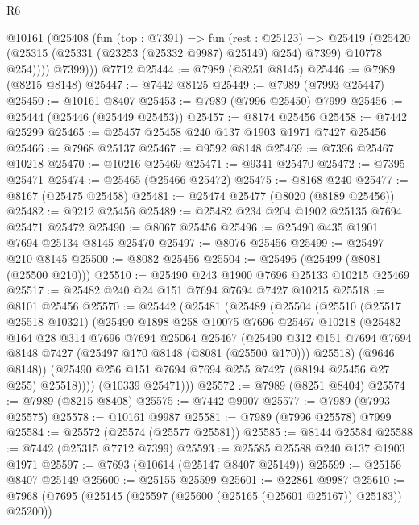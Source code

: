 \begin{lexlean}{R6}
\begin{coremodule}
        @10161
          (@25408
            (fun (top : @7391) =>
            fun (rest : @25123) =>
            @25419
              (@25420 (@25315 (@25331 (@23253 (@25332 @9987) @25149) @254) @7399) @10778 @254))))
          @7399)))
    @7712
@25444 := @7989 (@8251 @8145)
@25446 := @7989 (@8215 @8148)
@25447 := @7442 @8125
@25449 := @7989 (@7993 @25447)
@25450 := @10161 @8407
@25453 := @7989 (@7996 @25450) @7999
@25456 := @25444 (@25446 (@25449 @25453))
@25457 := @8174 @25456
@25458 := @7442 @25299
@25465 := @25457 @25458 @240 @137 @1903 @1971 @7427 @25456
@25466 := @7968 @25137
@25467 := @9592 @8148
@25469 := @7396 @25467 @10218
@25470 := @10216 @25469
@25471 := @9341 @25470
@25472 := @7395 @25471
@25474 := @25465 (@25466 @25472)
@25475 := @8168 @240
@25477 := @8167 (@25475 @25458)
@25481 := @25474 @25477 (@8020 (@8189 @25456))
@25482 := @9212 @25456
@25489 := @25482 @234 @204 @1902 @25135 @7694 @25471 @25472
@25490 := @8067 @25456
@25496 := @25490 @435 @1901 @7694 @25134 @8145 @25470
@25497 := @8076 @25456
@25499 := @25497 @210 @8145
@25500 := @8082 @25456
@25504 := @25496 (@25499 (@8081 (@25500 @210)))
@25510 := @25490 @243 @1900 @7696 @25133 @10215 @25469
@25517 := @25482 @240 @24 @151 @7694 @7694 @7427 @10215
@25518 := @8101 @25456
@25570 := @25442
    (@25481
      (@25489
        (@25504
          (@25510
            (@25517 @25518 @10321)
            (@25490
              @1898
              @258
              @10075
              @7696
              @25467
              @10218
              (@25482
                @164
                @28
                @314
                @7696
                @7694
                @25064
                @25467
                (@25490
                  @312
                  @151
                  @7694
                  @7694
                  @8148
                  @7427
                  (@25497 @170 @8148 (@8081 (@25500 @170)))
                  @25518)
                (@9646 @8148))
              (@25490 @256 @151 @7694 @7694 @255 @7427 (@8194 @25456 @27 @255) @25518))))
        (@10339 @25471)))
@25572 := @7989 (@8251 @8404)
@25574 := @7989 (@8215 @8408)
@25575 := @7442 @9907
@25577 := @7989 (@7993 @25575)
@25578 := @10161 @9987
@25581 := @7989 (@7996 @25578) @7999
@25584 := @25572 (@25574 (@25577 @25581))
@25585 := @8144 @25584
@25588 := @7442 (@25315 @7712 @7399)
@25593 := @25585 @25588 @240 @137 @1903 @1971
@25597 := @7693 (@10614 (@25147 @8407 @25149))
@25599 := @25156 @8407 @25149
@25600 := @25155 @25599
@25601 := @22861 @9987
@25610 := @7968 (@7695 (@25145 (@25597 (@25600 (@25165 (@25601 @25167)) @25183)) @25200))

\end{coremodule}
\end{lexlean}

